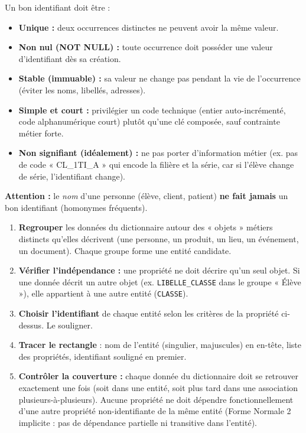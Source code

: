 \documentclass[11pt]{article}
\begin{document}
\begin{propriete}
Un bon identifiant doit être :
\begin{itemize}
  \item \textbf{Unique :} deux occurrences distinctes ne peuvent avoir la même valeur.
  \item \textbf{Non nul (NOT NULL) :} toute occurrence doit posséder une valeur d'identifiant dès sa création.
  \item \textbf{Stable (immuable) :} sa valeur ne change pas pendant la vie de l'occurrence (éviter les noms, libellés, adresses).
  \item \textbf{Simple et court :} privilégier un code technique (entier auto-incrémenté, code alphanumérique court) plutôt qu'une clé composée, sauf contrainte métier forte.
  \item \textbf{Non signifiant (idéalement) :} ne pas porter d'information métier (ex. pas de code « CL\_1TI\_A » qui encode la filière et la série, car si l'élève change de série, l'identifiant change).
\end{itemize}
\textbf{Attention :} le \emph{nom} d'une personne (élève, client, patient) \textbf{ne fait jamais} un bon identifiant (homonymes fréquents).
\end{propriete}

\begin{methode}
\begin{enumerate}
  \item \textbf{Regrouper} les données du dictionnaire autour des « objets » métiers distincts qu'elles décrivent (une personne, un produit, un lieu, un événement, un document). Chaque groupe forme une entité candidate.
  \item \textbf{Vérifier l'indépendance :} une propriété ne doit décrire qu'un seul objet. Si une donnée décrit un autre objet (ex. \texttt{LIBELLE\_CLASSE} dans le groupe « Élève »), elle appartient à une autre entité (\texttt{CLASSE}).
  \item \textbf{Choisir l'identifiant} de chaque entité selon les critères de la propriété ci-dessus. Le souligner.
  \item \textbf{Tracer le rectangle} : nom de l'entité (singulier, majuscules) en en-tête, liste des propriétés, identifiant souligné en premier.
  \item \textbf{Contrôler la couverture :} chaque donnée du dictionnaire doit se retrouver exactement une fois (soit dans une entité, soit plus tard dans une association plusieurs-à-plusieurs). Aucune propriété ne doit dépendre fonctionnellement d'une autre propriété non-identifiante de la même entité (Forme Normale 2 implicite : pas de dépendance partielle ni transitive dans l'entité).
\end{enumerate}
\end{methode}
\end{document}

